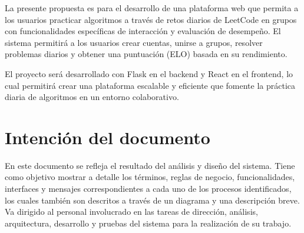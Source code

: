 La presente propuesta es para el desarrollo de una plataforma web que permita a los usuarios practicar algoritmos a través de retos diarios de LeetCode en grupos con funcionalidades específicas de interacción y evaluación de desempeño. El sistema permitirá a los usuarios crear cuentas, unirse a grupos, resolver problemas diarios y obtener una puntuación (ELO) basada en su rendimiento.

El proyecto será desarrollado con Flask en el backend y React en el frontend, lo cual permitirá crear una plataforma escalable y eficiente que fomente la práctica diaria de algoritmos en un entorno colaborativo.

\section{Intención del documento}
    En este documento se refleja el resultado del análisis y diseño del sistema. Tiene como objetivo mostrar a detalle los términos, reglas de negocio, funcionalidades, interfaces y mensajes correspondientes a cada uno de los procesos identificados, los cuales también son descritos a través de un diagrama y una descripción breve.\\
	Va dirigido al personal involucrado en las tareas de dirección, análisis, arquitectura, desarrollo y pruebas del sistema para la realización de su trabajo.